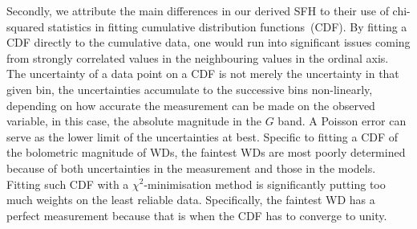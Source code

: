 \documentclass[fleqn,usenatbib]{mnras}
\begin{document}
Secondly, we attribute the main differences in our derived SFH to their
use of chi-squared statistics in fitting cumulative distribution
functions~(CDF). By fitting a CDF directly to the cumulative data, one would
run into significant issues coming from strongly correlated values in the
neighbouring values in the ordinal axis. The uncertainty of a data point on
a CDF is not merely the uncertainty in that given bin, the uncertainties
accumulate to the successive bins non-linearly, depending on how accurate the
measurement can be made on the observed variable, in this case, the absolute
magnitude in the $G$ band. A Poisson error can serve as the lower limit of
the uncertainties at best. Specific to fitting a CDF of the bolometric
magnitude of WDs, the faintest WDs are most poorly determined because of both
uncertainties in the measurement and those in the models. Fitting such CDF
with a $\chi^2$-minimisation method is significantly putting too much weights
on the least reliable data. Specifically, the faintest WD has a perfect
measurement because that is when the CDF has to converge to unity.
\end{document}
